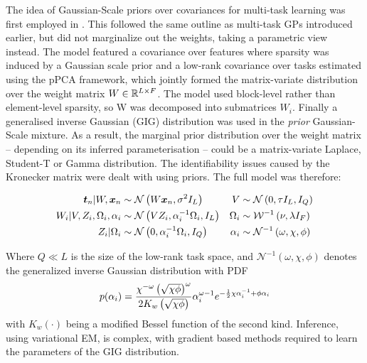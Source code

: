 The idea of Gaussian-Scale priors over covariances for multi-task learning was first employed in \cite{Archambeau2011}. This followed the same outline as multi-task GPs\cite{Bonilla2008} introduced earlier, but did not marginalize out the weights, taking a parametric view instead. The model featured a covariance over features where sparsity was induced by a Gaussian scale prior and a low-rank covariance over tasks estimated using the pPCA framework, which jointly formed the matrix-variate distribution over the weight matrix $W \in { \mathbb{R}^{L \times F} }$. The model used block-level rather than element-level sparsity, so W was decomposed into submatrices $W_i$. Finally a generalised inverse Gaussian (GIG) distribution was used in the \emph{prior} Gaussian-Scale mixture. As a result, the marginal prior distribution over the weight matrix -- depending on its inferred parameterisation -- could be a matrix-variate Laplace, Student-T or Gamma distribution. The identifiability issues caused by the Kronecker matrix were dealt with using priors. The full model was therefore:

\begin{align}
\bm t_n|W,\bm x_n & \sim \mathcal{N} \left( {W\bm x_n}, {\sigma^2 I_L} \right) &
V & \sim \mathcal{N} \left(0, \tau I_L, I_Q\right) \\
W_i | V, Z_i, \Omega_i,\alpha_i & \sim \mathcal{N} \left(VZ_i, \alpha_i^{-1} \Omega_i, I_L\right) &
\Omega_i & \sim \mathcal{W}^{-1}\left(\nu, \lambda I_F \right) \\
Z_i | \Omega_i & \sim \mathcal{N} \left(0, \alpha_i^{-1} \Omega_i, I_Q\right) &
\alpha_i & \sim\mathcal{N}^{-1}\left(\omega, \chi, \phi\right)
\end{align}

Where $Q \ll L$ is the size of the low-rank task space, and $\mathcal{N}^{-1}\left(\omega, \chi, \phi\right)$ denotes the generalized inverse Gaussian distribution with PDF
\begin{align}
p(\alpha_i) = \frac{\chi^{-\omega}\left(\sqrt{\chi \phi}\right)^\omega}{2 K_w \left(\sqrt{\chi \phi}\right)} \alpha_i^{\omega-1} e^{-\frac{1}{2} \chi \alpha_i^{-1} + \phi \alpha_i}
\end{align}
with $K_w(\cdot)$ being a modified Bessel function of the second kind. Inference, using variational EM, is complex, with gradient based methods required to learn the parameters of the GIG distribution.

